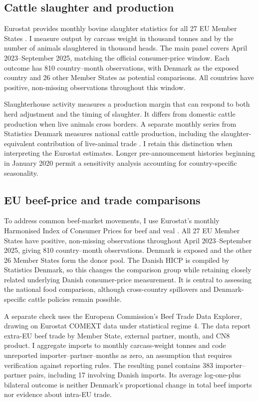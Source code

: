 \documentclass[11pt]{article}
\begin{document}
\subsection{Cattle slaughter and production}
Eurostat provides monthly bovine slaughter statistics for all 27 EU Member States \citep{eurostatslaughter2026}. I measure output by carcass weight in thousand tonnes and by the number of animals slaughtered in thousand heads. The main panel covers April 2023--September 2025, matching the official consumer-price window. Each outcome has 810 country--month observations, with Denmark as the exposed country and 26 other Member States as potential comparisons. All countries have positive, non-missing observations throughout this window.

Slaughterhouse activity measures a production margin that can respond to both herd adjustment and the timing of slaughter. It differs from domestic cattle production when live animals cross borders. A separate monthly series from Statistics Denmark measures national cattle production, including the slaughter-equivalent contribution of live-animal trade \citep{dstproduction2026}. I retain this distinction when interpreting the Eurostat estimates. Longer pre-announcement histories beginning in January 2020 permit a sensitivity analysis accounting for country-specific seasonality.

\subsection{EU beef-price and trade comparisons}
To address common beef-market movements, I use Eurostat's monthly Harmonised Index of Consumer Prices for beef and veal \citep{eurostathicp2026}. All 27 EU Member States have positive, non-missing observations throughout April 2023--September 2025, giving 810 country--month observations. Denmark is exposed and the other 26 Member States form the donor pool. The Danish HICP is compiled by Statistics Denmark, so this changes the comparison group while retaining closely related underlying Danish consumer-price measurement. It is central to assessing the national food comparison, although cross-country spillovers and Denmark-specific cattle policies remain possible.

A separate check uses the European Commission's Beef Trade Data Explorer, drawing on Eurostat COMEXT data under statistical regime 4. The data report extra-EU beef trade by Member State, external partner, month, and CN8 product. I aggregate imports to monthly carcass-weight tonnes and code unreported importer--partner--months as zero, an assumption that requires verification against reporting rules. The resulting panel contains 383 importer--partner pairs, including 17 involving Danish imports. Its average log-one-plus bilateral outcome is neither Denmark's proportional change in total beef imports nor evidence about intra-EU trade.
\end{document}
